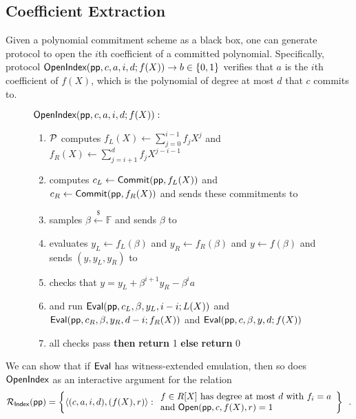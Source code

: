 \documentclass{article}
\theoremstyle{definition}
\begin{document}
\subsection{Coefficient Extraction} \label{section:generic_coefficient_extraction}

Given a polynomial commitment scheme as a black box, one can generate protocol to open the $i$th coefficient of a committed polynomial. Specifically, protocol $\textsf{{OpenIndex}}(\textsf{pp}, c, a, i, d; f(X)) \rightarrow b \in \{0,1\}$ verifies that $a$ is the $i$th coefficient of $f(X)$, which is the polynomial of degree at most $d$ that $c$ commits to.

\begin{figure}[!htp]
\noindent\begin{mdframed}[userdefinedwidth=\textwidth]
\begin{minipage}{\textwidth}
	\begin{flushleft}
	$\textsf{{OpenIndex}}(\textsf{pp}, c, a, i, d; f(X)):$ 
		\begin{enumerate}[nolistsep]
		    \item $\mathcal{P}$ computes $f_L(X) \gets \sum_{j=0}^{i-1} f_jX^j$ and $f_R(X) \gets \sum_{j=i+1}^d f_j X^{j-i-1}$
		    \item \prover computes $c_L \gets \textsf{{Commit}}(\textsf{pp}, f_L(X))$ and $c_R \gets \textsf{{Commit}}(\textsf{pp}, f_R(X))$ and sends these commitments to \verifier
		    \item \verifier samples $\beta \xleftarrow{\$} \mathbb{F}$ and sends $\beta$ to \prover
		    \item \prover evaluates $y_L \gets f_L(\beta)$ and $y_R \gets f_R(\beta)$ and $y \gets f(\beta)$ and sends $(y, y_L, y_R)$ to \verifier
		    \item \verifier checks that $y = y_L + \beta^{i+1} y_R - \beta^i a$
		    \item \prover and \verifier run $\textsf{{Eval}}(\textsf{pp}, c_L, \beta, y_L, i-i; L(X))$ and $\textsf{{Eval}}(\textsf{pp}, c_R, \beta, y_R, d-i; f_R(X))$ and $\textsf{{Eval}}(\textsf{pp}, c, \beta, y, d; f(X))$
		    \item \pcif{}all checks pass \textbf{then} \textbf{return} 1 \textbf{else} \textbf{return} 0
		\end{enumerate}
	\end{flushleft}
\end{minipage}
\end{mdframed}
\end{figure}

We can show that if $\textsf{{Eval}}$ has witness-extended emulation, then so does $\textsf{{OpenIndex}}$ as an interactive argument for the relation
\[ 
\mathcal{R_\textsf{Index}}(\textsf{pp}) = \left\{
\langle (c, a, i, d), (f(X), r) \rangle
: 
\begin{array}{l} 
f \in R[X] \ \text{has degree at most} \ d \ \text{with} \ f_i = a \\ 
 \text{and} \ \textsf{{Open}}(\textsf{pp}, c, f(X), r) = 1 \\
\end{array}
\right\} \enspace .
\] 
\end{document}
